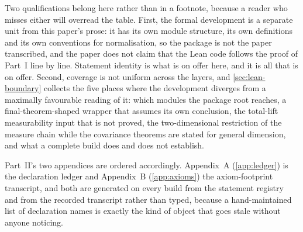 Two qualifications belong here rather than in a footnote, because a reader who
misses either will overread the table.  First, the formal development is a
separate unit from this paper's prose: it has its own module structure, its own
definitions and its own conventions for normalisation, so the package is not the
paper transcribed, and the paper does not claim that the Lean code follows the
proof of Part~I line by line.  Statement identity is what is on offer here, and
it is all that is on offer.  Second, coverage is not uniform across the layers,
and \cref{sec:lean-boundary} collects the five places where the development
diverges from a maximally favourable reading of it: which modules the package
root reaches, a final-theorem-shaped wrapper that assumes its own conclusion,
the total-lift measurability input that is not proved, the two-dimensional
restriction of the measure chain while the covariance theorems are stated for
general dimension, and what a complete build does and does not establish.

Part~II's two appendices are ordered accordingly.  Appendix~A
(\cref{app:ledger}) is the declaration ledger and Appendix~B
(\cref{app:axioms}) the axiom-footprint transcript, and both are generated on
every build from the statement registry and from the recorded transcript rather
than typed, because a hand-maintained list of declaration names is exactly the
kind of object that goes stale without anyone noticing.
